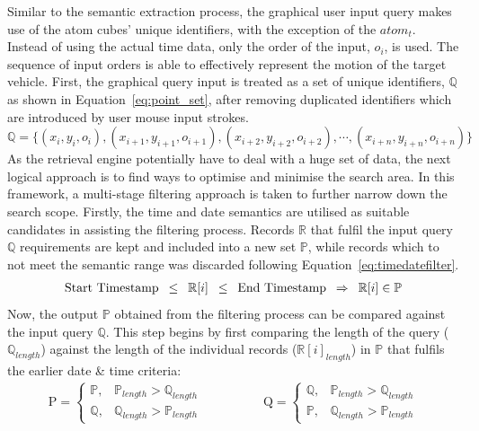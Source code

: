 Similar to the semantic extraction process, the graphical user input query makes use of the atom cubes' unique identifiers, with the exception of the $atom_t$. 
Instead of using the actual time data, only the order of the input, $o_{i}$, is used. The sequence of input orders is able to effectively represent the motion of the target vehicle. First, the graphical query input is treated as a set of unique identifiers, $\mathbb{Q}$ as shown in Equation~\ref{eq:point_set}, after removing duplicated identifiers which are introduced by user mouse input strokes.
\begin{equation}
\label{eq:point_set}
    \mathbb{Q} = \{ (x_i, y_i, o_i), (x_{i+1}, y_{i+1}, o_{i+1}), (x_{i+2}, y_{i+2}, o_{i+2}), \dotsb,(x_{i+n}, y_{i+n}, o_{i+n})\}
\end{equation}
As the retrieval engine potentially have to deal with a huge set of data, the next logical approach is to find ways to optimise and minimise the search area. In this framework, a multi-stage filtering approach is taken to further narrow down the search scope.
Firstly, the time and date semantics are utilised as 
suitable candidates in assisting the filtering process. Records $\mathbb{R}$ that fulfil the input query $\mathbb{Q}$ requirements are kept and
included into a new set $\mathbb{P}$, while records which to not meet the semantic range was discarded following Equation~\ref{eq:timedatefilter}.
\begin{gather}
\label{eq:timedatefilter}
  \text{Start Timestamp} \hspace{.5em} \leq \hspace{.5em} \mathbb{R}[i] \hspace{.5em} \leq \hspace{.5em} \text{End Timestamp} \hspace{.5em} \Rightarrow \hspace{.5em} \mathbb{R}[i] \in \mathbb{P}
\end{gather}
Now, the output $\mathbb{P}$ obtained from the filtering process can be compared against the input query $\mathbb{Q}$. This step begins by first comparing the length of the query ($\mathbb{Q}_{length}$) against the length
of the individual records ($\mathbb{R}[i]_{length}$) in $\mathbb{P}$ that
fulfils the earlier date \& time criteria:
\begin{align}
\mathrm{P} =\begin{cases}
\mathbb{P}, & \mathbb{P}_{length} > \mathbb{Q}_{length} \\
\mathbb{Q}, & \mathbb{Q}_{length} > \mathbb{P}_{length}
\end{cases}   \hspace{2em}  &  \hspace{2em}
\mathrm{Q} =\begin{cases}
\mathbb{Q}, & \mathbb{P}_{length} > \mathbb{Q}_{length} \\
\mathbb{P}, & \mathbb{Q}_{length} > \mathbb{P}_{length}
\end{cases}
\end{align}
